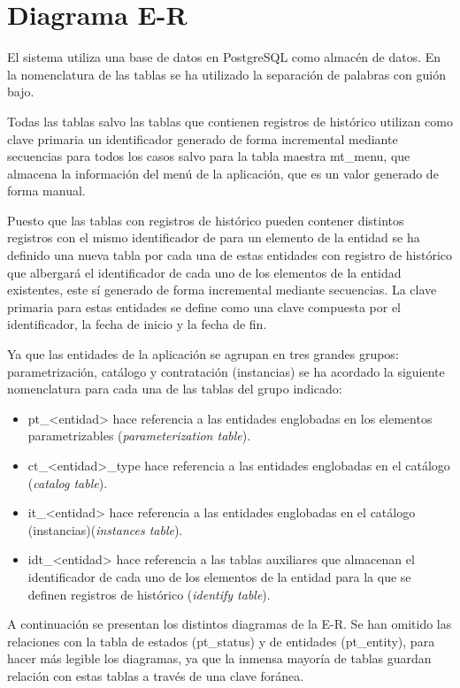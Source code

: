 \section{Diagrama E-R}
\label{sec:diagramaE-R}

El sistema utiliza una base de datos en PostgreSQL como almacén de datos.
En la nomenclatura de las tablas se ha utilizado la separación de palabras con guión bajo. 

Todas las tablas salvo las tablas que contienen registros de histórico utilizan como clave primaria un identificador generado de forma incremental mediante secuencias para todos los casos salvo para la tabla maestra  mt\_menu, que almacena la información del menú de la aplicación, que es un valor generado de forma manual.

Puesto que las tablas con registros de histórico pueden contener distintos registros con el mismo identificador de para un elemento de la entidad se ha definido una nueva tabla por cada una de estas entidades con registro de histórico que albergará el identificador de cada uno de los elementos de la entidad existentes, este sí generado de forma incremental mediante secuencias. La clave primaria para estas entidades se define como una clave compuesta por el identificador, la fecha de inicio y la fecha de fin.



Ya que las entidades de la aplicación se agrupan en tres grandes grupos: parametrización, catálogo y contratación (instancias) se ha acordado la siguiente nomenclatura para cada una de las tablas del grupo indicado:
\begin{itemize}
\item pt\_<entidad> hace referencia a las entidades englobadas en los elementos parametrizables (\textit{parameterization table}).
\item ct\_<entidad>\_type hace referencia a las entidades englobadas en el catálogo (\textit{catalog table}).
\item it\_<entidad> hace referencia a las entidades englobadas en el catálogo (instancias)(\textit{instances table}).
\item idt\_<entidad> hace referencia a las tablas auxiliares que almacenan el identificador de cada uno de los elementos de la entidad para la que se definen registros de histórico (\textit{identify table}).
\end{itemize}


A continuación se presentan los distintos diagramas de la E-R. Se han omitido las relaciones con la tabla de estados (pt\_status) y de entidades (pt\_entity), para hacer más legible los diagramas, ya que la inmensa mayoría de tablas guardan relación con estas tablas a través de una clave foránea.

